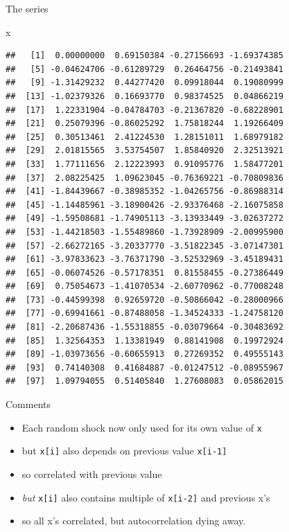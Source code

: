 \documentclass[
  ignorenonframetext,
]{beamer}
\newenvironment{Shaded}{\begin{snugshade}}{\end{snugshade}}
\newcommand{\NormalTok}[1]{#1}
\providecommand{\tightlist}{%
  \setlength{\itemsep}{0pt}\setlength{\parskip}{0pt}}
\begin{document}
\begin{frame}[fragile]{The series}
\protect\hypertarget{the-series-1}{}

\begin{Shaded}
\begin{Highlighting}[]
\NormalTok{x}
\end{Highlighting}
\end{Shaded}

\begin{verbatim}
##   [1]  0.00000000  0.69150384 -0.27156693 -1.69374385
##   [5] -0.04624706 -0.61289729  0.26464756 -0.21493841
##   [9] -1.31429232  0.44277420  0.09918044  0.19080999
##  [13] -1.02379326  0.16693770  0.98374525  0.04866219
##  [17]  1.22331904 -0.04784703 -0.21367820 -0.68228901
##  [21]  0.25079396 -0.86025292  1.75818244  1.19266409
##  [25]  0.30513461  2.41224530  1.28151011  1.68979182
##  [29]  2.01815565  3.53754507  1.85840920  2.32513921
##  [33]  1.77111656  2.12223993  0.91095776  1.58477201
##  [37]  2.08225425  1.09623045 -0.76369221 -0.70809836
##  [41] -1.84439667 -0.38985352 -1.04265756 -0.86988314
##  [45] -1.14485961 -3.18900426 -2.93376468 -2.16075858
##  [49] -1.59508681 -1.74905113 -3.13933449 -3.02637272
##  [53] -1.44218503 -1.55489860 -1.73928909 -2.00995900
##  [57] -2.66272165 -3.20337770 -3.51822345 -3.07147301
##  [61] -3.97833623 -3.76371790 -3.52532969 -3.45189431
##  [65] -0.06074526 -0.57178351  0.81558455 -0.27386449
##  [69]  0.75054673 -1.41070534 -2.60770962 -0.77008248
##  [73] -0.44599398  0.92659720 -0.50866042 -0.28000966
##  [77] -0.69941661 -0.87488058 -1.34524333 -1.24758120
##  [81] -2.20687436 -1.55318855 -0.03079664 -0.30483692
##  [85]  1.32564353  1.13381949  0.88141908  0.19972924
##  [89] -1.03973656 -0.60655913  0.27269352  0.49555143
##  [93]  0.74140308  0.41684887 -0.01247512 -0.08955967
##  [97]  1.09794055  0.51405840  1.27608083  0.05862015
\end{verbatim}

\end{frame}

\begin{frame}[fragile]{Comments}
\protect\hypertarget{comments-49}{}

\begin{itemize}
\tightlist
\item
  Each random shock now only used for its own value of \texttt{x}
\item
  but \texttt{x{[}i{]}} also depends on previous value
  \texttt{x{[}i-1{]}}
\item
  so correlated with previous value
\item
  \emph{but} \texttt{x{[}i{]}} also contains multiple of
  \texttt{x{[}i-2{]}} and previous x's
\item
  so all x's correlated, but autocorrelation dying away.
\end{itemize}

\end{frame}
\end{document}
